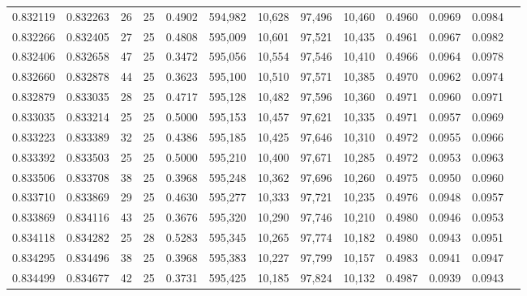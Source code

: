 \begin{tabular}{rrrrrrrrrrrrr}
0.832119 & 0.832263 &    26 &  25 &                                     0.4902 & 594,982 &  10,628 &  97,496 &  10,460 & 0.4960 & 0.0969 & 0.0984 \\
0.832266 & 0.832405 &    27 &  25 &                                     0.4808 & 595,009 &  10,601 &  97,521 &  10,435 & 0.4961 & 0.0967 & 0.0982 \\
0.832406 & 0.832658 &    47 &  25 &                                     0.3472 & 595,056 &  10,554 &  97,546 &  10,410 & 0.4966 & 0.0964 & 0.0978 \\
0.832660 & 0.832878 &    44 &  25 &                                     0.3623 & 595,100 &  10,510 &  97,571 &  10,385 & 0.4970 & 0.0962 & 0.0974 \\
0.832879 & 0.833035 &    28 &  25 &                                     0.4717 & 595,128 &  10,482 &  97,596 &  10,360 & 0.4971 & 0.0960 & 0.0971 \\
0.833035 & 0.833214 &    25 &  25 &                                     0.5000 & 595,153 &  10,457 &  97,621 &  10,335 & 0.4971 & 0.0957 & 0.0969 \\
0.833223 & 0.833389 &    32 &  25 &                                     0.4386 & 595,185 &  10,425 &  97,646 &  10,310 & 0.4972 & 0.0955 & 0.0966 \\
0.833392 & 0.833503 &    25 &  25 &                                     0.5000 & 595,210 &  10,400 &  97,671 &  10,285 & 0.4972 & 0.0953 & 0.0963 \\
0.833506 & 0.833708 &    38 &  25 &                                     0.3968 & 595,248 &  10,362 &  97,696 &  10,260 & 0.4975 & 0.0950 & 0.0960 \\
0.833710 & 0.833869 &    29 &  25 &                                     0.4630 & 595,277 &  10,333 &  97,721 &  10,235 & 0.4976 & 0.0948 & 0.0957 \\
0.833869 & 0.834116 &    43 &  25 &                                     0.3676 & 595,320 &  10,290 &  97,746 &  10,210 & 0.4980 & 0.0946 & 0.0953 \\
0.834118 & 0.834282 &    25 &  28 &                                     0.5283 & 595,345 &  10,265 &  97,774 &  10,182 & 0.4980 & 0.0943 & 0.0951 \\
0.834295 & 0.834496 &    38 &  25 &                                     0.3968 & 595,383 &  10,227 &  97,799 &  10,157 & 0.4983 & 0.0941 & 0.0947 \\
0.834499 & 0.834677 &    42 &  25 &                                     0.3731 & 595,425 &  10,185 &  97,824 &  10,132 & 0.4987 & 0.0939 & 0.0943 \\

\end{tabular}
